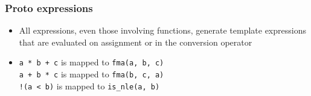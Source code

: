 \documentclass{beamer}
\begin{document}
\begin{frame}
	\frametitle{Proto expressions}
	
	\begin{itemize}
		\item All expressions, even those involving functions,
		      generate template expressions that are evaluated on assignment
		      or in the conversion operator
		\item \lstinline{a * b + c} is mapped to \lstinline{fma(a, b, c)}\\
		      \lstinline{a + b * c} is mapped to \lstinline{fma(b, c, a)}\\
		      \lstinline{!(a < b)} is mapped to \lstinline{is_nle(a, b)}
	\end{itemize}
	
\end{frame}
\end{document}
